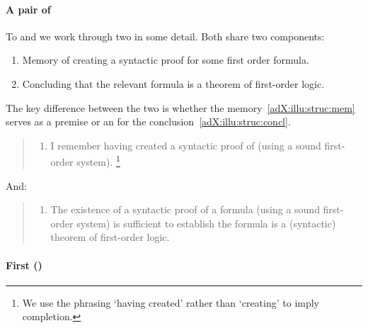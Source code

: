 \paragraph{A pair of }

\begin{note}
  To  \adA{} and \adB{} we work through two  in some detail.
  Both  share two components:
  \begin{enumerate}[label=\alph*., ref=(\alph*)]
  \item
    \label{adX:illu:struc:mem}
    Memory of creating a syntactic proof for some first order formula.
  \item
    \label{adX:illu:struc:concl}
    Concluding that the relevant formula is a theorem of first-order logic.
  \end{enumerate}

  The key difference between the two  is whether the memory~\ref{adX:illu:struc:mem} serves as a premise or an  for the conclusion~\ref{adX:illu:struc:concl}.

\end{note}
\begin{note}
  \begin{quote}
    \begin{enumerate}[%
      label={(Mem)},%
      ref={(Mem)}%
      ]
    \item
      \label{ill:Eproof:mem}
      I remember having created a syntactic proof of  (using a sound first-order system).%
      \footnote{
        We use the phrasing `having created' rather than `creating' to imply completion.
      }
    \end{enumerate}
  \end{quote}
  And:
  \begin{quote}
    \begin{enumerate}[%
      label={(\(\exists\mathord{\vdash}{,}\top\))},%
      ref={(\(\exists\mathord{\vdash}{,}\top\))}%
      ]
    \item
      \label{ill:Eproof:def}
      The existence of a syntactic proof of a formula (using a sound first-order system) is sufficient to establish the formula is a (syntactic) theorem of first-order logic.
    \end{enumerate}
  \end{quote}
\end{note}

\paragraph{First  (\adA{})}

